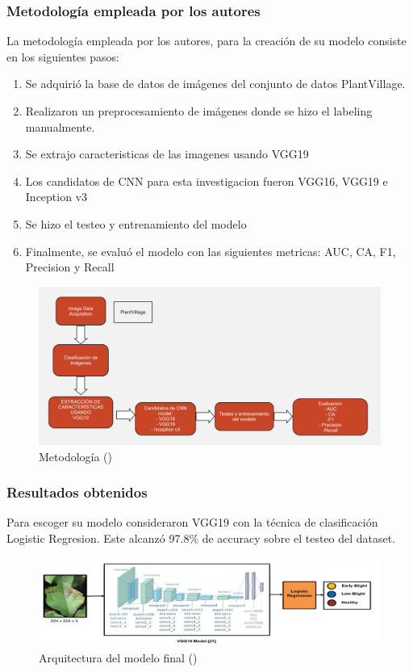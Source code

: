 \subsubsection{Metodología empleada por los autores}
La metodología empleada por los autores, para la creación de su modelo consiste en los siguientes pasos: 
\begin{enumerate}
	\item Se adquirió la base de datos de imágenes del conjunto de datos PlantVillage.
	\item Realizaron un preprocesamiento de imágenes donde se hizo el labeling manualmente.
	\item Se extrajo caracteristicas de las imagenes usando VGG19
	\item Los candidatos de CNN para esta investigacion fueron VGG16, VGG19 e Inception v3
	\item Se hizo el testeo y entrenamiento del modelo
	\item Finalmente, se evaluó el modelo con las siguientes metricas: AUC, CA, F1, Precision y Recall
\end{enumerate}
\begin{figure}[H]
	\begin{center}
		\includegraphics[width=1\textwidth]{2/figures/ant7.jpg}
		\caption{Metodología (\cite{antecedente7})}
	\end{center}
\end{figure}

\subsubsection{Resultados obtenidos}
Para escoger su modelo consideraron VGG19 con la técnica de clasificación Logistic Regresion. Este alcanzó 97.8\% de accuracy sobre el testeo del dataset. 

\begin{figure}[H]
	\begin{center}
		\includegraphics[width=1\textwidth]{2/figures/ant7.2.jpeg}
		\caption{Arquitectura del modelo final (\cite{antecedente7})}
	\end{center}
\end{figure}
